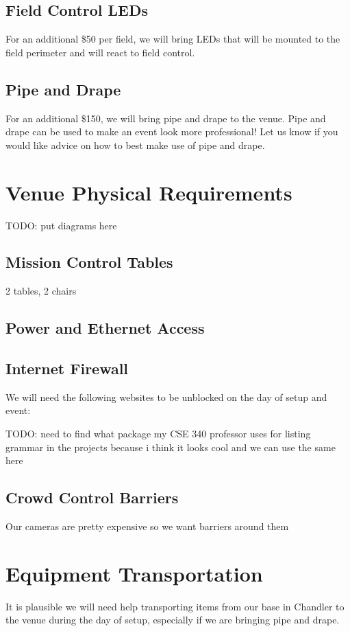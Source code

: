 \documentclass[12pt]{article}
\begin{document}
\subsection{Field Control LEDs}
For an additional \$50 per field, we will bring LEDs that will be mounted to the field perimeter and will react to field control.

\subsection{Pipe and Drape}
For an additional \$150, we will bring pipe and drape to the venue.
Pipe and drape can be used to make an event look more professional!
Let us know if you would like advice on how to best make use of pipe and drape.

\section{Venue Physical Requirements}
TODO: put diagrams here
\subsection{Mission Control Tables}
2 tables, 2 chairs
\subsection{Power and Ethernet Access}
\subsection{Internet Firewall}
We will need the following websites to be unblocked on the day of setup and event:

TODO: need to find what package my CSE 340 professor uses for listing grammar in the projects because i think it looks cool and we can use the same here
\subsection{Crowd Control Barriers}
Our cameras are pretty expensive so we want barriers around them

\section{Equipment Transportation}
It is plausible we will need help transporting items from our base in Chandler to the venue during the day of setup, especially if we are bringing pipe and drape.
\end{document}
